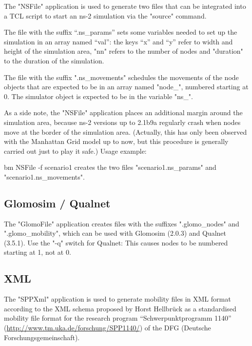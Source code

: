 \documentclass[11pt,a4paper,twoside,normalheadings,headsepline,DIV13,BCOR11mm,openright]{article}
\begin{document}
The  "NSFile"  application  is  used  to  generate two files that can be
integrated into a TCL  script  to  start  an  ns-2  simulation  via  the
"source" command.

The  file with the suffix ``.ns\_params'' sets some variables needed to set
up the simulation in an array named ``val'': the keys ``x'' and ``y'' refer to
width  and  height  of the simulation area, "nn" refers to the number of
nodes and "duration" to the duration of the simulation.

The file with the suffix ".ns\_movements" schedules the movements of  the
node objects that are expected to be in an array named "node\_", numbered
starting at 0. The simulator object is expected to be  in  the  variable
"ns\_".

As  a  side  note,  the "NSFile" application places an additional margin
around the simulation area, because ns-2 versions up to 2.1b9a regularly
crash  when  nodes move at the border of the simulation area. (Actually,
this has only been observed with the Manhattan Grid model up to now, but
this procedure is generally carried out just to play it safe.)
\newline \newline
Usage example:\newline

   bm NSFile -f scenario1
\newline \newline
creates      the      two      files      "scenario1.ns\_params"      and
"scenario1.ns\_movements".


\subsection{Glomosim / Qualnet}


The  "GlomoFile"   application   creates   files   with   the   suffixes
".glomo\_nodes"  and  ".glomo\_mobility",  which can be used with Glomosim
(2.0.3) and Qualnet (3.5.1). Use  the  "-q"  switch  for  Qualnet:  This
causes nodes to be numbered starting at 1, not at 0.


\subsection{XML}


The "SPPXml" application is used to generate mobility files in XML
format according to the XML schema proposed by Horst Hellbrück as a
standardised mobility file format for the research program
``Schwerpunktprogramm 1140''
(\url{http://www.tm.uka.de/forschung/SPP1140/}) of the DFG (Deutsche
Forschungsgemeinschaft).
\end{document}
